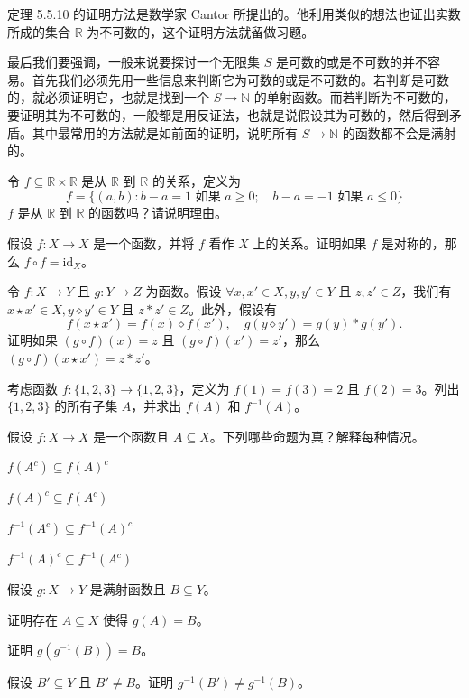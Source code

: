 定理 5.5.10 的证明方法是数学家 Cantor 所提出的。他利用类似的想法也证出实数所成的集合 $\mathbb{R}$ 为不可数的，这个证明方法就留做习题。

最后我们要强调，一般来说要探讨一个无限集 $S$ 是可数的或是不可数的并不容易。首先我们必须先用一些信息来判断它为可数的或是不可数的。若判断是可数的，就必须证明它，也就是找到一个 $S \to \mathbb{N}$ 的单射函数。而若判断为不可数的，要证明其为不可数的，一般都是用反证法，也就是说假设其为可数的，然后得到矛盾。其中最常用的方法就是如前面的证明，说明所有 $S \to \mathbb{N}$ 的函数都不会是满射的。

\begin{problemset}
    \item 令 $f \subseteq \mathbb{R} \times \mathbb{R}$ 是从 $\mathbb{R}$ 到 $\mathbb{R}$ 的关系，定义为
    $$ f = \{(a, b) : b - a = 1 \text{ 如果 } a \geq 0; \quad b - a = -1 \text{ 如果 } a \leq 0\} $$
    $f$ 是从 $\mathbb{R}$ 到 $\mathbb{R}$ 的函数吗？请说明理由。

    \item 假设 $f : X \to X$ 是一个函数，并将 $f$ 看作 $X$ 上的关系。证明如果 $f$ 是对称的，那么 $f \circ f = \text{id}_X$。

    \item 令 $f : X \to Y$ 且 $g : Y \to Z$ 为函数。假设 $\forall x, x' \in X, y, y' \in Y$ 且 $z, z' \in Z$，我们有 $x \star x' \in X, y \diamond y' \in Y$ 且 $z \ast z' \in Z$。此外，假设有
    $$ f(x \star x') = f(x) \diamond f(x'), \quad g(y \diamond y') = g(y) \ast g(y'). $$
    证明如果 $(g \circ f)(x) = z$ 且 $(g \circ f)(x') = z'$，那么 $(g \circ f)(x \star x') = z \ast z'$。

    \item 考虑函数 $f : \{1, 2, 3\} \to \{1, 2, 3\}$，定义为 $f(1) = f(3) = 2$ 且 $f(2) = 3$。列出 $\{1, 2, 3\}$ 的所有子集 $A$，并求出 $f(A)$ 和 $f^{-1}(A)$。

    \item 假设 $f : X \to X$ 是一个函数且 $A \subseteq X$。下列哪些命题为真？解释每种情况。
    \begin{probenumerate}
        \item $f(A^c) \subseteq f(A)^c$
        \item $f(A)^c \subseteq f(A^c)$
        \item $f^{-1}(A^c) \subseteq f^{-1}(A)^c$
        \item $f^{-1}(A)^c \subseteq f^{-1}(A^c)$
    \end{probenumerate}

    \item 假设 $g : X \to Y$ 是满射函数且 $B \subseteq Y$。
    \begin{probenumerate}
        \item 证明存在 $A \subseteq X$ 使得 $g(A) = B$。
        \item 证明 $g(g^{-1}(B)) = B$。
        \item 假设 $B' \subseteq Y$ 且 $B' \neq B$。证明 $g^{-1}(B') \neq g^{-1}(B)$。
    \end{probenumerate}


\end{problemset}
